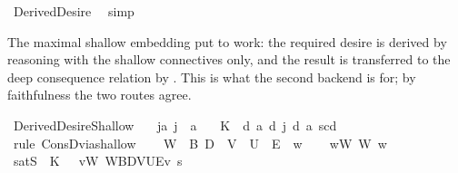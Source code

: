 \begin{isabellebody}
\endisadelimproof
%
\isatagproof
{}\isamarkupfalse%
\ DerivedDesire\ \isamarkupfalse%
\ simp%
\endisatagproof
{\isafoldproof}%
%
\isadelimproof
%
\endisadelimproof
%
\isadelimdocument
%
\endisadelimdocument
%
\isatagdocument
%
\isamarkuptrue%
%
\endisatagdocument
{\isafolddocument}%
%
\isadelimdocument
%
\endisadelimdocument
%
\begin{isamarkuptext}%
The maximal shallow embedding put to work: the required desire is derived by
reasoning with the shallow connectives only, and the result is transferred to the
deep consequence relation by . This is what the second backend
is for; by faithfulness the two routes agree.%
\end{isamarkuptext}\isamarkuptrue%
\isamarkupfalse%
\ DerivedDesireShallow{\isacharcolon}{\kern0pt}\isanewline
\ \ \ ja{\isacharcolon}{\kern0pt}\ {\isachardoublequoteopen}j\ {\isasymnoteq}\ a{\isachardoublequoteclose}\isanewline
\ \ \ {\isachardoublequoteopen}{\isasymGamma}\isactrlsub K\ {\isasymTurnstile}\ {\isasymD}\isactrlsup d\ a\ {\isacharparenleft}{\kern0pt}{\isasymB}\isactrlsup d\ j\ {\isacharparenleft}{\kern0pt}{\isasymB}\isactrlsup d\ a\ {\isacharbraceleft}{\kern0pt}s\isactrlsup c{\isacharbraceright}{\kern0pt}\isactrlsup d{\isacharparenright}{\kern0pt}{\isacharparenright}{\kern0pt}{\isachardoublequoteclose}\isanewline
%
\isadelimproof
%
\endisadelimproof
%
\isatagproof
{}\isamarkupfalse%
\ {\isacharparenleft}{\kern0pt}rule\ ConsD{\isacharunderscore}{\kern0pt}via{\isacharunderscore}{\kern0pt}shallow{\isacharparenright}{\kern0pt}\isanewline
\ \ \isamarkupfalse%
\ W{\isacharcolon}{\kern0pt}{\isacharcolon}{\kern0pt}{\isasymW}\ \ B\ D{\isacharcolon}{\kern0pt}{\isacharcolon}{\kern0pt}{\isasymR}\ \ V{\isacharcolon}{\kern0pt}{\isacharcolon}{\kern0pt}{\isasymV}\ \ U{\isacharcolon}{\kern0pt}{\isacharcolon}{\kern0pt}{\isasymU}\ \ E{\isacharcolon}{\kern0pt}{\isacharcolon}{\kern0pt}{\isasymE}\ \ w{\isacharcolon}{\kern0pt}{\isacharcolon}{\kern0pt}{\isasymw}\isanewline
\ \ \isamarkupfalse%
\ wW{\isacharcolon}{\kern0pt}\ {\isachardoublequoteopen}W\ w{\isachardoublequoteclose}\isanewline
\ \ \isamarkupfalse%
\ satS{\isacharcolon}{\kern0pt}\ {\isachardoublequoteopen}{\isasymforall}{\isasymgamma}{\isachardot}{\kern0pt}\ {\isasymGamma}\isactrlsub K\ {\isasymgamma}\ {\isasymlongrightarrow}\ {\isacharparenleft}{\kern0pt}{\isasymforall}v{\isacharcolon}{\kern0pt}W{\isachardot}{\kern0pt}\ {\isasymlangle}W{\isacharcomma}{\kern0pt}B{\isacharcomma}{\kern0pt}D{\isacharcomma}{\kern0pt}V{\isacharcomma}{\kern0pt}U{\isacharcomma}{\kern0pt}E{\isasymrangle}{\isacharcomma}{\kern0pt}v\ {\isasymTurnstile}\isactrlsup s\ {\isasymlparr}{\isasymgamma}{\isasymrparr}{\isacharparenright}{\kern0pt}{\isachardoublequoteclose}\isanewline

\end{isabellebody}
